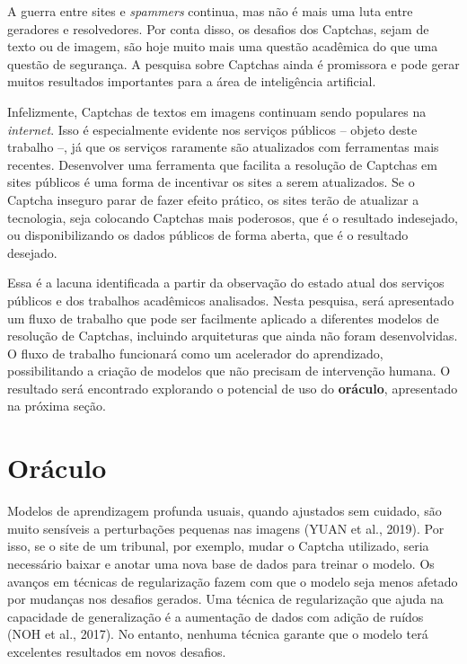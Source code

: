 \documentclass[12pt,twoside,brazilian]{book}
\begin{document}
A guerra entre sites e \emph{spammers} continua, mas não é mais uma luta
entre geradores e resolvedores. Por conta disso, os desafios dos
Captchas, sejam de texto ou de imagem, são hoje muito mais uma questão
acadêmica do que uma questão de segurança. A pesquisa sobre Captchas
ainda é promissora e pode gerar muitos resultados importantes para a
área de inteligência artificial.

Infelizmente, Captchas de textos em imagens continuam sendo populares na
\emph{internet}. Isso é especialmente evidente nos serviços públicos --
objeto deste trabalho --, já que os serviços raramente são atualizados
com ferramentas mais recentes. Desenvolver uma ferramenta que facilita a
resolução de Captchas em sites públicos é uma forma de incentivar os
sites a serem atualizados. Se o Captcha inseguro parar de fazer efeito
prático, os sites terão de atualizar a tecnologia, seja colocando
Captchas mais poderosos, que é o resultado indesejado, ou
disponibilizando os dados públicos de forma aberta, que é o resultado
desejado.

Essa é a lacuna identificada a partir da observação do estado atual dos
serviços públicos e dos trabalhos acadêmicos analisados. Nesta pesquisa,
será apresentado um fluxo de trabalho que pode ser facilmente aplicado a
diferentes modelos de resolução de Captchas, incluindo arquiteturas que
ainda não foram desenvolvidas. O fluxo de trabalho funcionará como um
acelerador do aprendizado, possibilitando a criação de modelos que não
precisam de intervenção humana. O resultado será encontrado explorando o
potencial de uso do \textbf{oráculo}, apresentado na próxima seção.

\hypertarget{sec-intro-oraculo}{%
\section{Oráculo}\label{sec-intro-oraculo}}

Modelos de aprendizagem profunda usuais, quando ajustados sem cuidado,
são muito sensíveis a perturbações pequenas nas imagens (YUAN et al.,
2019). Por isso, se o site de um tribunal, por exemplo, mudar o Captcha
utilizado, seria necessário baixar e anotar uma nova base de dados para
treinar o modelo. Os avanços em técnicas de regularização fazem com que
o modelo seja menos afetado por mudanças nos desafios gerados. Uma
técnica de regularização que ajuda na capacidade de generalização é a
aumentação de dados com adição de ruídos (NOH et al., 2017). No entanto,
nenhuma técnica garante que o modelo terá excelentes resultados em novos
desafios.
\end{document}
